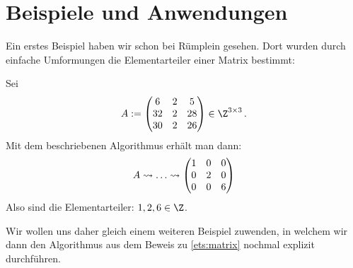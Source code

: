 
\chapter{Beispiele und Anwendungen}
Ein erstes Beispiel haben wir schon bei Rümplein\cite{talk:ruemp} gesehen. Dort wurden
durch einfache Umformungen die Elementarteiler einer Matrix bestimmt:

\begin{thBeisp}
    Sei 
    \[ A := \Matrix{
           6 & 2 &  5 \\
          32 & 2 & 28 \\
          30 & 2 & 26  } \in \Z^{3\times3}
    \,. \]
    Mit dem beschriebenen Algorithmus erhält man dann:
    \[
        A
        \rightsquigarrow \ldots
        \rightsquigarrow 
    \begin{pmatrix} 
        1 & 0 & 0 \\
        0 & 2 & 0 \\
        0 & 0 & 6   \end{pmatrix}
    \]
    Also sind die Elementarteiler: $1,2,6 \in\Z$.
\end{thBeisp}

Wir wollen uns daher gleich einem weiteren Beispiel zuwenden, in welchem wir
dann den Algorithmus aus dem Beweis zu \cref{ets:matrix} nochmal explizit
durchführen.

